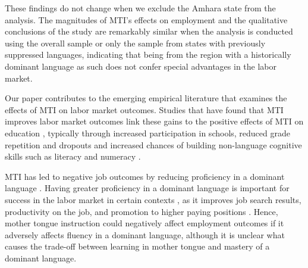 These findings do not change when we exclude the Amhara state from the analysis. The magnitudes of MTI's effects on employment and the qualitative conclusions of the study are remarkably similar when the analysis is conducted using the overall sample or only the sample from states with previously suppressed languages, indicating that being from the region with a historically dominant language as such does not confer special advantages in the labor market. 

Our paper contributes to the emerging empirical literature that examines the effects of MTI on labor market outcomes. Studies that have found that MTI improves labor market outcomes link these gains to the positive effects of MTI on education \citep[e.g.,][]{eriksson_does_2014,seid_does_2016,Alidou2006,Walter2012,eriksson_does_2014,taylor_estimating_2016,seid_does_2016,piper_implementing_2016,ramachandran_language_2017,laitin_legacy_2019}, typically through increased participation in schools, reduced grade repetition and dropouts \citep{Benson2000,Benson2005,bender_their_2005} and increased chances of building non-language cognitive skills such as literacy and numeracy \citep{eriksson_does_2014,Trudell2012}.  



MTI has led to negative job outcomes by reducing proficiency in a dominant language \citep[e.g.,][]{angrist_effect_1997}. Having greater proficiency in a dominant language is important for success in the labor market in certain contexts \citep{chiswick_immigrant_2000,chiswick_endogeneity_2015,bleakley_language_2004,munshi_traditional_2006,lang_return_2009,aldashev_language_2009,shastry_human_2012,casale_english_2011,parinduri_effects_2018}, as it improves job search results, productivity on the job, and promotion to higher paying positions \citet{kahn_returns_2019}. %
Hence, mother tongue instruction could negatively affect employment outcomes if it adversely affects fluency in a dominant language, although it is unclear what causes the trade-off between learning in mother tongue and mastery of a dominant language. 

